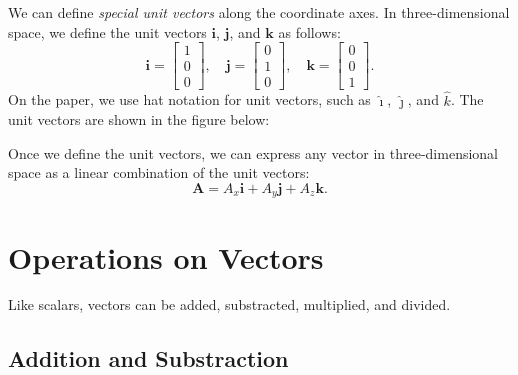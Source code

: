 \documentclass[../main.tex]{subfiles}
\begin{document}
We can define \emph{special unit vectors} along the coordinate axes. In three-dimensional space, we define the unit vectors $\mathbf{i}$, $\mathbf{j}$, and $\mathbf{k}$ as follows:
\[
\mathbf{i} = \begin{bmatrix} 1 \\ 0 \\ 0 \end{bmatrix}, \quad
\mathbf{j} = \begin{bmatrix} 0 \\ 1 \\ 0 \end{bmatrix}, \quad
\mathbf{k} = \begin{bmatrix} 0 \\ 0 \\ 1 \end{bmatrix}.
\] 
On the paper, we use hat notation for unit vectors, such as \(\hat{\imath}\), \(\hat{\jmath}\), and \(\hat{k}\). The unit vectors are shown in the figure below:
\begin{figure}[h]
\centering
{}
\end{figure}

Once we define the unit vectors, we can express any vector in three-dimensional space as a linear combination of the unit vectors:
\[
\mathbf{A} = A_x \mathbf{i} + A_y \mathbf{j} + A_z \mathbf{k}.
\]


\section{Operations on Vectors}

Like scalars, vectors can be added, substracted, multiplied, and divided.


\subsection{Addition and Substraction}
\end{document}
